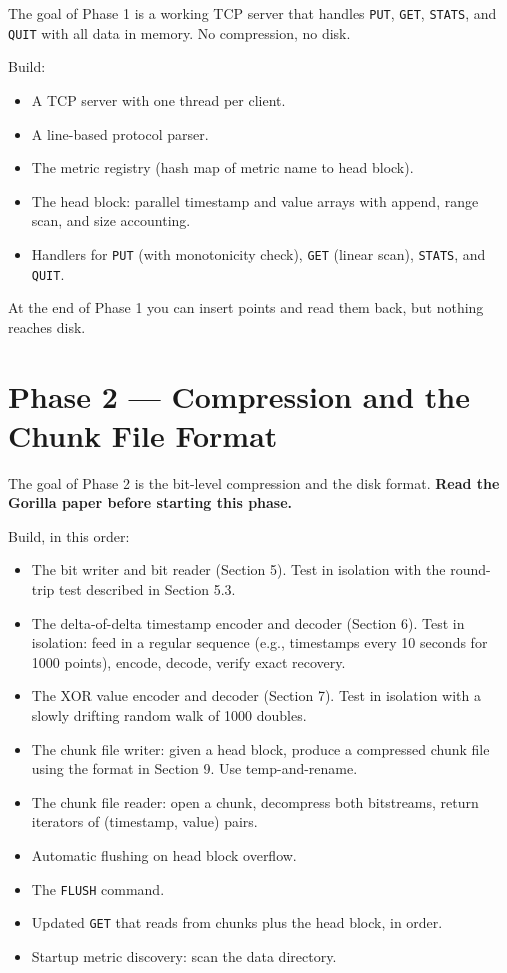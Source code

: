 \documentclass[11pt,a4paper]{article}
\begin{document}
The goal of Phase 1 is a working TCP server that handles \texttt{PUT}, \texttt{GET}, \texttt{STATS}, and \texttt{QUIT} with all data in memory. No compression, no disk.

Build:
\begin{itemize}
\item A TCP server with one thread per client.
\item A line-based protocol parser.
\item The metric registry (hash map of metric name to head block).
\item The head block: parallel timestamp and value arrays with append, range scan, and size accounting.
\item Handlers for \texttt{PUT} (with monotonicity check), \texttt{GET} (linear scan), \texttt{STATS}, and \texttt{QUIT}.
\end{itemize}

At the end of Phase 1 you can insert points and read them back, but nothing reaches disk.

\section{Phase 2 --- Compression and the Chunk File Format}

The goal of Phase 2 is the bit-level compression and the disk format. \textbf{Read the Gorilla paper before starting this phase.}

Build, in this order:
\begin{itemize}
\item The bit writer and bit reader (Section 5). Test in isolation with the round-trip test described in Section 5.3.
\item The delta-of-delta timestamp encoder and decoder (Section 6). Test in isolation: feed in a regular sequence (e.g., timestamps every 10 seconds for 1000 points), encode, decode, verify exact recovery.
\item The XOR value encoder and decoder (Section 7). Test in isolation with a slowly drifting random walk of 1000 doubles.
\item The chunk file writer: given a head block, produce a compressed chunk file using the format in Section 9. Use temp-and-rename.
\item The chunk file reader: open a chunk, decompress both bitstreams, return iterators of (timestamp, value) pairs.
\item Automatic flushing on head block overflow.
\item The \texttt{FLUSH} command.
\item Updated \texttt{GET} that reads from chunks plus the head block, in order.
\item Startup metric discovery: scan the data directory.
\end{itemize}
\end{document}
